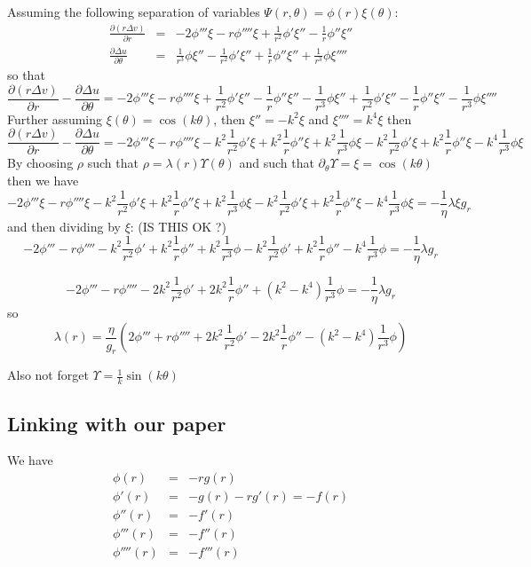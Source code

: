 Assuming the following separation of variables $\boxed{\Psi(r,\theta)=\phi(r)\xi(\theta)}$:
\begin{eqnarray}
\frac{\partial (r  \Delta v)}{\partial r}
&=& -2 \phi''' \xi - r \phi'''' \xi + \frac{1}{r^2} \phi' \xi''  - \frac{1}{r} \phi'' \xi'' \\
\frac{\partial  \Delta u}{\partial \theta}
&=&
\frac{1}{r^3} \phi \xi '' -
\frac{1}{r^2} \phi' \xi'' +
\frac{1}{r} \phi'' \xi'' +
\frac{1}{r^3} \phi \xi''''
\end{eqnarray}
so that 
\[
\frac{\partial (r  \Delta v)}{\partial r} - \frac{\partial  \Delta u}{\partial \theta}
=  -2 \phi''' \xi - r \phi'''' \xi + \frac{1}{r^2} \phi' \xi''  - \frac{1}{r} \phi'' \xi'' 
-\frac{1}{r^3} \phi \xi '' +
\frac{1}{r^2} \phi' \xi'' -
\frac{1}{r} \phi'' \xi'' -
\frac{1}{r^3} \phi \xi''''
\]
Further assuming $\boxed{\xi(\theta)=\cos(k\theta)}$, then $\xi''=-k^2 \xi$ and $\xi''''=k^4 \xi$
then 
\[
\frac{\partial (r  \Delta v)}{\partial r} - \frac{\partial  \Delta u}{\partial \theta}
=  -2 \phi''' \xi - r \phi'''' \xi - k^2 \frac{1}{r^2} \phi' \xi  +k^2 \frac{1}{r} \phi'' \xi 
+ k^2\frac{1}{r^3} \phi \xi  
-k^2\frac{1}{r^2} \phi' \xi 
+k^2 \frac{1}{r} \phi'' \xi 
- k^4\frac{1}{r^3} \phi \xi
\]
By choosing $\rho$ such that $\rho= \lambda(r) \Upsilon(\theta)$ and such that 
$\partial_\theta \Upsilon = \xi=\cos(k\theta)$
then we have 
\[
 -2 \phi''' \xi - r \phi'''' \xi - k^2 \frac{1}{r^2} \phi' \xi  +k^2 \frac{1}{r} \phi'' \xi 
+ k^2\frac{1}{r^3} \phi \xi  
-k^2\frac{1}{r^2} \phi' \xi 
+k^2 \frac{1}{r} \phi'' \xi 
- k^4\frac{1}{r^3} \phi \xi
=
- \frac{1}{\eta} \lambda \xi  g_r
\]
and then dividing by $\xi$: (IS THIS OK ?)
\[
 -2 \phi'''  - r \phi''''  - k^2 \frac{1}{r^2} \phi'   +k^2 \frac{1}{r} \phi''  
+ k^2\frac{1}{r^3} \phi 
-k^2\frac{1}{r^2} \phi' 
+k^2 \frac{1}{r} \phi'' 
- k^4\frac{1}{r^3} \phi 
=
- \frac{1}{\eta} \lambda   g_r
\]

\[
-2 \phi'''  - r \phi''''  
- 2k^2 \frac{1}{r^2} \phi'   
+2k^2 \frac{1}{r} \phi''  
+ (k^2-k^4) \frac{1}{r^3} \phi 
=
- \frac{1}{\eta} \lambda   g_r
\]
so 
\[
\boxed{
\lambda(r) = \frac{\eta}{g_r} \left( 
2 \phi'''  + r \phi''''  + 2k^2 \frac{1}{r^2} \phi'   
-2k^2 \frac{1}{r} \phi''  
- (k^2-k^4) \frac{1}{r^3} \phi 
\right)
}
\]

Also not forget $\Upsilon=\frac{1}{k}\sin(k\theta)$

\subsection{Linking with our paper}
We have 
\begin{eqnarray}
\phi(r) &=& -rg(r) \\
\phi'(r) &=& -g(r) - r g'(r) = -f(r) \\
\phi''(r) &=& -f'(r) \\
\phi'''(r) &=& -f''(r) \\
\phi''''(r) &=& -f'''(r) 
\end{eqnarray}

